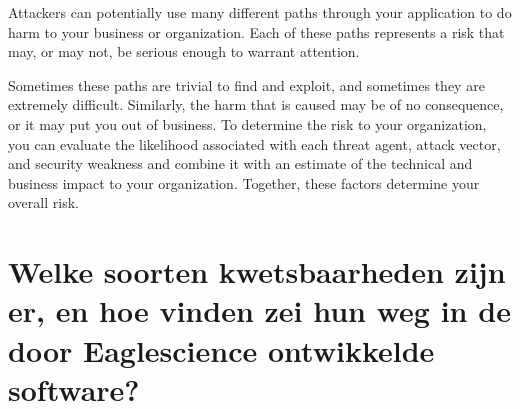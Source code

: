 Attackers can potentially use many different paths through your application to do harm to your business or organization. Each of these paths represents a risk that may, or may not, be serious enough to warrant attention.

 Sometimes these paths are trivial to find and exploit, and sometimes they are extremely difficult. Similarly, the harm that is caused may be of no consequence, or it may put you out of business. To determine the risk to your organization, you can evaluate the likelihood associated with each threat agent, attack vector, and security weakness and combine it with an estimate of the technical and business impact to your organization. Together, these factors determine your overall risk.

\section{Welke soorten kwetsbaarheden zijn er, en hoe vinden zei hun weg in de door Eaglescience ontwikkelde software?}



